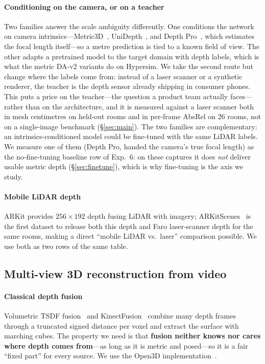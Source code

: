 \paragraph{Conditioning on the camera, or on a teacher} Two families answer the scale ambiguity differently. One
conditions the network on camera intrinsics---Metric3D~\cite{metric3d}, UniDepth~\cite{unidepth}, and Depth
Pro~\cite{depthpro}, which estimates the focal length itself---so a metre prediction is tied to a known field of view.
The other adapts a pretrained model to the target domain with depth labels, which is what the metric DA-v2 variants do
on Hypersim. We take the second route but change where the labels come from: instead of a laser scanner or a synthetic
renderer, the teacher is the depth sensor already shipping in consumer phones. This puts a price on the teacher---the
question a product team actually faces---rather than on the architecture, and it is measured against a laser scanner
both in mesh centimetres on held-out rooms and in per-frame AbsRel on 26 rooms, not on a single-image benchmark
(\S\ref{sec:main}). The two families are complementary: an
intrinsics-conditioned model could be fine-tuned with the same LiDAR labels. We measure one of them
(Depth Pro, handed the camera's true focal length) as the no-fine-tuning baseline row of Exp.~6: on these captures it does
\emph{not} deliver usable metric depth (\S\ref{sec:finetune}), which is why fine-tuning is the axis we study.

\paragraph{Mobile LiDAR depth} ARKit provides $256\times192$ depth fusing LiDAR with imagery; ARKitScenes~\cite{arkitscenes}
is the first dataset to release both this depth and Faro laser-scanner depth for the same rooms, making a direct
``mobile LiDAR vs.\ laser'' comparison possible. We use both as two rows of the same table.

\subsection{Multi-view 3D reconstruction from video}\label{sec:related-mv}
\paragraph{Classical depth fusion} Volumetric TSDF fusion~\cite{curless96} and KinectFusion~\cite{kinectfusion}
combine many depth frames through a truncated signed distance per voxel and extract the surface with marching cubes.
The property we need is that \textbf{fusion neither knows nor cares where depth comes from}---as long as it is metric
and posed---so it is a fair ``fixed part'' for every source. We use the Open3D implementation~\cite{open3d}.

